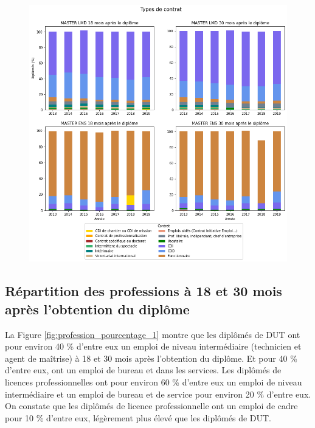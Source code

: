 \documentclass[12pt, a4paper, titlepage, table]{article}
\begin{document}
		\begin{figure}[H]
			\centering
			\includegraphics[width=1\textwidth]{../graphs/repartition_contrats_situation_2.png}
			\label{fig:contrat_pourcentage_2}
		\end{figure}

	\subsection{Répartition des professions à 18 et 30 mois après l'obtention du diplôme}
	La Figure \ref{fig:profession_pourcentage_1} montre que les diplômés de DUT ont pour environ 40 \% d'entre eux un emploi de niveau intermédiaire (technicien et agent de maîtrise) à 18 et 30 mois après l'obtention du diplôme. Et pour 40 \% d'entre eux, ont un emploi de bureau et dans les services.
	Les diplômés de licences professionnelles ont pour environ 60 \% d'entre eux un emploi de niveau intermédiaire et un emploi de bureau et de service pour environ 20 \% d'entre eux.
	On constate que les diplômés de licence professionnelle ont un emploi de cadre pour 10 \% d'entre eux, légèrement plus élevé que les diplômés de DUT.
	
\end{document}
